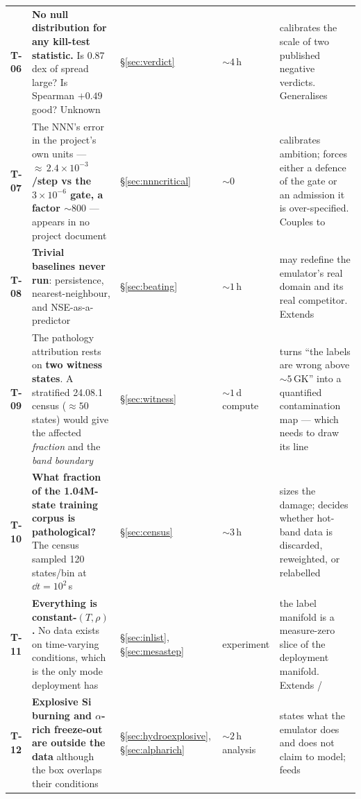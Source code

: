 \begin{longtable}{@{}L{1.0cm} L{6.0cm} L{2.2cm} L{1.7cm} L{4.7cm}@{}}
\textbf{T-06} &
\textbf{No null distribution for any kill-test statistic.} Is 0.87 dex of
\rQSE{} spread large? Is Spearman $+0.49$ good? Unknown &
\S\ref{sec:verdict} & ${\sim}4$\,h &
calibrates the scale of two published negative verdicts. Generalises
 \\

\textbf{T-07} &
The NNN's \Ye{} error in the project's own units --- \textbf{${\approx}\,2.4
\times 10^{-3}$/step vs the $3 \times 10^{-6}$ gate, a factor ${\sim}800$}
--- appears in no project document & \S\ref{sec:nnncritical} & ${\sim}0$ &
calibrates ambition; forces either a defence of the gate or an admission it
is over-specified. Couples to  \\

\textbf{T-08} &
\textbf{Trivial baselines never run}: persistence, nearest-neighbour, and
NSE-as-a-predictor & \S\ref{sec:beating} & ${\sim}1$\,h &
may redefine the emulator's real domain and its real competitor. Extends
 \\

\textbf{T-09} &
The pathology attribution rests on \textbf{two witness states}. A stratified
24.08.1 census (${\approx}50$ states) would give the affected \emph{fraction}
and the \emph{band boundary} & \S\ref{sec:witness} & ${\sim}1$\,d compute &
turns ``the labels are wrong above ${\sim}5$\,GK'' into a quantified
contamination map --- which  needs to draw its line \\

\textbf{T-10} &
\textbf{What fraction of the 1.04M-state training corpus is pathological?}
The census sampled 120 states/bin at $\dd t = 10^{2}$\,s &
\S\ref{sec:census} & ${\sim}3$\,h &
sizes the damage; decides whether hot-band data is discarded, reweighted, or
relabelled \\

\textbf{T-11} &
\textbf{Everything is constant-$(T, \rho)$.} No data exists on time-varying
conditions, which is the only mode deployment has &
\S\ref{sec:inlist}, \S\ref{sec:mesastep} & experiment &
the label manifold is a measure-zero slice of the deployment manifold. Extends
 /  \\

\textbf{T-12} &
\textbf{Explosive Si burning and $\alpha$-rich freeze-out are outside the
data} although the box overlaps their conditions &
\S\ref{sec:hydroexplosive}, \S\ref{sec:alpharich} & ${\sim}2$\,h analysis &
states what the emulator does and does not claim to model; feeds  \\


\end{longtable}
